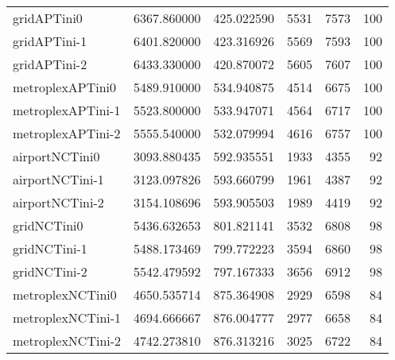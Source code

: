 \begin{longtable}{lrrrrr}
gridAPTini0 & 6367.860000 & 425.022590 & 5531 & 7573 & 100 \\
gridAPTini-1 & 6401.820000 & 423.316926 & 5569 & 7593 & 100 \\
gridAPTini-2 & 6433.330000 & 420.870072 & 5605 & 7607 & 100 \\
metroplexAPTini0 & 5489.910000 & 534.940875 & 4514 & 6675 & 100 \\
metroplexAPTini-1 & 5523.800000 & 533.947071 & 4564 & 6717 & 100 \\
metroplexAPTini-2 & 5555.540000 & 532.079994 & 4616 & 6757 & 100 \\
airportNCTini0 & 3093.880435 & 592.935551 & 1933 & 4355 & 92 \\
airportNCTini-1 & 3123.097826 & 593.660799 & 1961 & 4387 & 92 \\
airportNCTini-2 & 3154.108696 & 593.905503 & 1989 & 4419 & 92 \\
gridNCTini0 & 5436.632653 & 801.821141 & 3532 & 6808 & 98 \\
gridNCTini-1 & 5488.173469 & 799.772223 & 3594 & 6860 & 98 \\
gridNCTini-2 & 5542.479592 & 797.167333 & 3656 & 6912 & 98 \\
metroplexNCTini0 & 4650.535714 & 875.364908 & 2929 & 6598 & 84 \\
metroplexNCTini-1 & 4694.666667 & 876.004777 & 2977 & 6658 & 84 \\
metroplexNCTini-2 & 4742.273810 & 876.313216 & 3025 & 6722 & 84 \\
\end{longtable}

